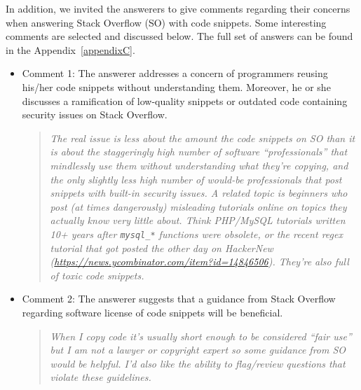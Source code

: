 \documentclass{svjour3}                     %
\begin{document}
\vspace{0.5cm} \noindent{} \vspace{0.5cm}


In addition, we invited the answerers to give comments regarding their concerns
when answering Stack Overflow (SO) with code snippets. Some interesting comments
are selected and discussed below. The full set of answers can be found in the
Appendix~\ref{appendixC}.

\begin{itemize}[label={}] \itemsep1em \item Comment 1: The answerer addresses a
	concern of programmers reusing his/her code snippets without understanding them.
	Moreover, he or she discusses a ramification of low-quality snippets or outdated
	code containing security issues on Stack Overflow.
	
	\begin{quote}\textit{The real issue is less about the amount the code snippets
			on SO than it is about the staggeringly high number of software
			``professionals'' that mindlessly use them without understanding what they're
			copying, and the only slightly less high number of would-be professionals that
			post snippets with built-in security issues.  A related topic is beginners who
			post (at times dangerously) misleading tutorials online on topics they actually
			know very little about. Think PHP/MySQL tutorials written 10+ years after
			\texttt{mysql\_*} functions were obsolete, or the recent regex tutorial that
			got posted the other day on HackerNew
			(\url{https://news.ycombinator.com/item?id=14846506}). They're also full of
			toxic code snippets.}\end{quote}
	
	\item Comment 2: The answerer suggests that a guidance from Stack Overflow
	regarding software license of code snippets will be beneficial.
	
	\begin{quote}\textit{When I copy code it's usually short enough to be
			considered ``fair use'' but I am not a lawyer or copyright expert so some
			guidance from SO would be helpful. I'd also like the ability to flag/review
			questions that violate these guidelines.}\end{quote}
	

\end{itemize}
\end{document}
